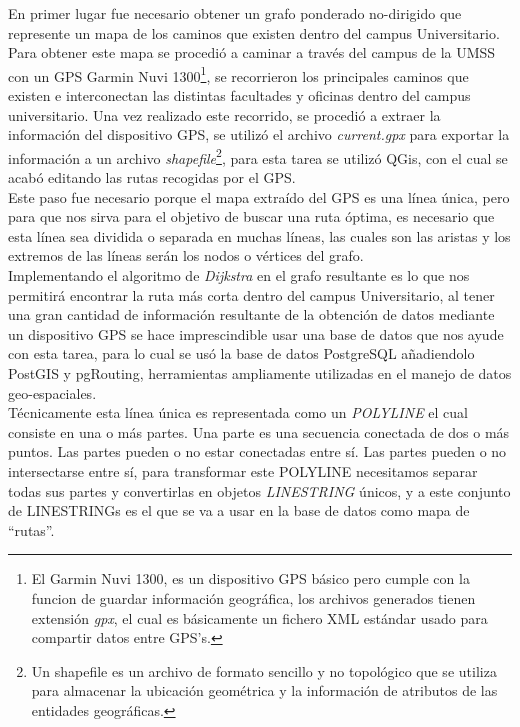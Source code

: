   En primer lugar fue necesario obtener un grafo ponderado no-dirigido que represente un mapa de los caminos que existen dentro del campus Universitario.\\

  Para obtener este mapa se procedió a caminar a través del campus de la UMSS con un GPS Garmin Nuvi 1300\footnote{El Garmin Nuvi 1300, es un dispositivo GPS básico pero cumple con la funcion de guardar información geográfica, los archivos generados tienen extensión \emph{gpx}, el cual es básicamente un fichero XML estándar usado para compartir datos entre GPS's.}, se recorrieron los principales caminos que existen e interconectan las distintas facultades y oficinas dentro del campus universitario. Una vez realizado este recorrido, se procedió a extraer la información del dispositivo GPS, se utilizó el archivo \emph{current.gpx} para exportar la información  a un archivo \emph{shapefile}\footnote{Un shapefile es un archivo de formato sencillo y no topológico que se utiliza para almacenar la ubicación geométrica y la información de atributos de las entidades geográficas.\cite{what_is_shapefile} }, para esta tarea se utilizó QGis, con el cual se acabó editando las rutas recogidas por el GPS.\\

  Este paso fue necesario porque el mapa extraído del GPS es una línea única, pero para que nos sirva para el objetivo de buscar una ruta óptima, es necesario que esta línea sea dividida o separada en muchas líneas, las cuales son las aristas y los extremos de las líneas serán los nodos o vértices del grafo.\\

  Implementando el algoritmo de \emph{Dijkstra} en el grafo resultante es lo que nos permitir\'a encontrar la ruta más corta dentro del campus Universitario, al tener una gran cantidad de información resultante de la obtención de datos mediante un dispositivo GPS se hace imprescindible usar una base de datos que nos ayude con esta tarea, para lo cual se usó la base de datos PostgreSQL añadiendolo PostGIS y pgRouting, herramientas ampliamente utilizadas en el manejo de datos geo-espaciales.\\



  Técnicamente esta línea única es representada como un \emph{POLYLINE} el cual consiste en una o más partes. Una parte es una secuencia conectada de dos o más puntos. Las partes pueden o no estar conectadas entre sí. Las partes pueden o no intersectarse entre sí, para transformar este POLYLINE necesitamos separar todas sus partes y convertirlas en objetos \emph{LINESTRING} únicos, y a este conjunto de LINESTRINGs es el que se va a usar en la base de datos como mapa de ``rutas''.\cite{esri_shapefile}\\


